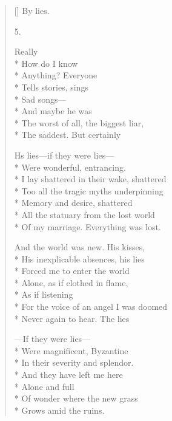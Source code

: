 \begin{verse}[\versewidth]
By lies.

5.

Really\\*
How do I know \\*
Anything? Everyone\\*
Tells stories, sings\\*
Sad songs---\\*
                        And maybe he was\\*
The worst of all, the biggest liar,\\*
The saddest.  But certainly

Hs lies---if they were lies---\\*
Were wonderful, entrancing.\\*
I lay shattered in their wake, shattered\\*
Too all the tragic myths underpinning\\*
Memory and desire, shattered\\*
All the statuary from the lost world\\*
Of my marriage. Everything was lost.

And the world was new.  His kisses,\\*
His inexplicable absences, his lies\\*
Forced me to enter the world \\*
Alone, as if clothed in flame,\\*
As if listening\\*
For the voice of an angel I was doomed\\*
Never again to hear.    The lies

---If they were lies---\\*
Were magnificent, Byzantine\\*
 In their severity and splendor.\\*
And they have left me here\\*
Alone and full\\*
Of wonder where the new grass\\*
Grows amid the ruins.
\end{verse}
